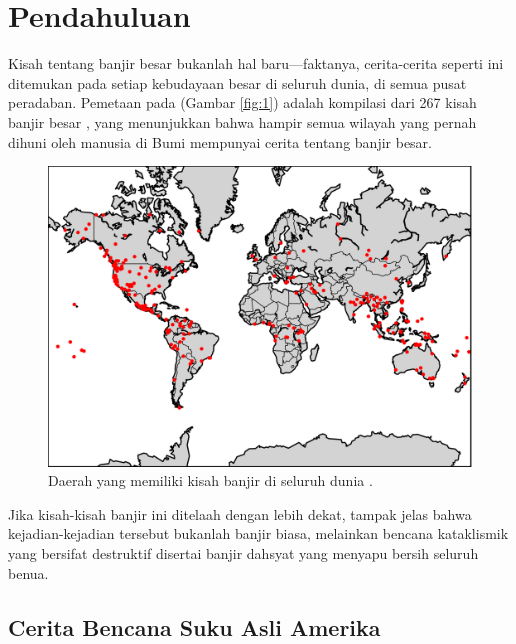 \documentclass[10pt,twocolumn,letterpaper]{article}
\begin{document}
\section{Pendahuluan}

Kisah tentang banjir besar bukanlah hal baru—faktanya, cerita-cerita seperti ini ditemukan pada setiap kebudayaan besar di seluruh dunia, di semua pusat peradaban. Pemetaan pada (Gambar \ref{fig:1}) adalah kompilasi dari 267 kisah banjir besar \cite{3}, yang menunjukkan bahwa hampir semua wilayah yang pernah dihuni oleh manusia di Bumi mempunyai cerita tentang banjir besar.

\begin{figure}[h]
\begin{center}
   \includegraphics[width=1\linewidth]{b.png}
\end{center}
   \caption{Daerah yang memiliki kisah banjir di seluruh dunia \cite{3}.}
\label{fig:1}
\label{fig:onecol}
\end{figure}

Jika kisah-kisah banjir ini ditelaah dengan lebih dekat, tampak jelas bahwa kejadian-kejadian tersebut bukanlah banjir biasa, melainkan bencana kataklismik yang bersifat destruktif disertai banjir dahsyat yang menyapu bersih seluruh benua.

\subsection{Cerita Bencana Suku Asli Amerika}
\end{document}
